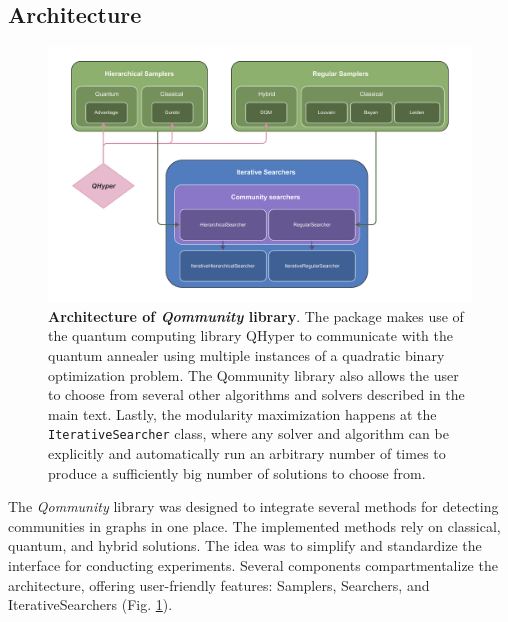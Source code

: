 \documentclass[pdflatex,sn-mathphys-num]{sn-jnl}%
\begin{document}
\subsection*{Architecture}
\begin{figure}[h]
    \centering
    \includegraphics[width=1\linewidth]{Figures/FigS9.pdf}
    \caption{\textbf{Architecture of \textit{Qommunity} library}. The package makes use of the quantum computing library QHyper \cite{lamza_qhyper_2024} to communicate with the quantum annealer using multiple instances of a quadratic binary optimization problem. The Qommunity library also allows the user to choose from several other algorithms and solvers described in the main text. Lastly, the modularity maximization happens at the {\tt IterativeSearcher} class, where any solver and algorithm can be explicitly and automatically run an arbitrary number of times to produce a sufficiently big number of solutions to choose from.}
    \label{fig:qommunity_architecture}
\end{figure}

The \textit{Qommunity} library was designed to integrate several methods for detecting communities in graphs in one place. The implemented methods rely on classical, quantum, and hybrid solutions. The idea was to simplify and standardize the interface for conducting experiments. Several components compartmentalize the architecture, offering user-friendly features: Samplers, Searchers, and IterativeSearchers (Fig. \ref{fig:qommunity_architecture}).
\end{document}
